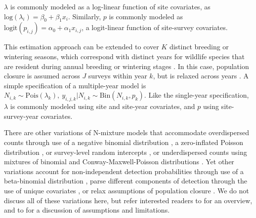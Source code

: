 \documentclass[codesnippet]{jss}
\begin{document}
$\lambda$ is commonly modeled as a log-linear function of site covariates, as $\text{log}(\lambda_i) = \beta_0 + \beta_1 x_i$. Similarly, $p$ is commonly modeled as $\text{logit}(p_{i,j}) = \alpha_0 + \alpha_1 x_{i,j}$, a logit-linear function of site-survey covariates.

This estimation approach can be extended to cover $K$ distinct breeding or wintering seasons, which correspond with distinct years for wildlife species that are resident during annual breeding or wintering stages \citep{Kery_Dorazio_Soldaat_Van_Strien_Zuiderwijk_Royle_2009}. In this case, population closure is assumed across $J$ surveys within year $k$, but is relaxed across years \citep{Kery_Dorazio_Soldaat_Van_Strien_Zuiderwijk_Royle_2009}. A simple specification of a multiple-year model is $N_{i,k} \sim \text{Pois}(\lambda_{k}), \ y_{i,j,k} | N_{i,k} \sim \text{Bin}(N_{i,k}, p_{k})$. Like the single-year specification, $\lambda$ is commonly modeled using site and site-year covariates, and $p$ using site-survey-year covariates. 

There are other variations of N-mixture models that accommodate overdispersed counts through use of a negative binomial distribution \citep{Kery_Royle_2010}, a zero-inflated Poisson distribution \citep{Wenger_Freeman_2008}, or survey-level random intercepts \citep{Kery_Schaub_2011}, or underdispersed counts using mixtures of binomial and Conway-Maxwell-Poisson distributions \citep{wu2015bayesian}. Yet other variations account for non-independent detection probabilities through use of a beta-binomial distribution \citep{Martin_Royle_Mackenzie_Edwards_Kery_Gardner_2011}, parse different components of detection through the use of unique covariates \citep{O'Donnell_Thompson_III_Semlitsch_2015}, or relax assumptions of population closure \citep{Chandler_Royle_King_2011, Dail_Madsen_2011}. We do not discuss all of these variations here, but refer interested readers to \cite{Denes_Silveira_Beissinger_2015} for an overview, and to \cite{Barker_Schofield_Link_Sauer_et_al_2017} for a discussion of assumptions and limitations.
\end{document}
